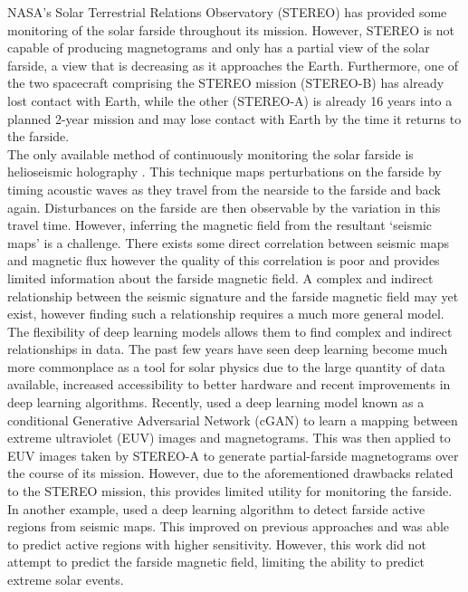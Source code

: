 \documentclass[11pt,a4paper,onecolumn]{report}
\begin{document}
NASA's Solar Terrestrial Relations Observatory (STEREO) has provided some
monitoring of the solar farside throughout its mission. However, STEREO is not
capable of producing magnetograms and only has a partial view of the solar
farside, a view that is decreasing as it approaches the Earth.
Furthermore, one of the two spacecraft comprising the STEREO mission (STEREO-B)
has already lost contact with Earth, while the other (STEREO-A) is already 16
years into a planned 2-year mission and may lose contact with Earth by the time
it returns to the farside. \\



The only available method of continuously monitoring the solar farside
is helioseismic holography \citep{lindsey_seismic_2000}. This technique maps
perturbations on the farside by timing acoustic waves as they travel from the
nearside to the farside and back again. Disturbances on the farside are then
observable by the variation in this travel time. However, inferring the magnetic
field from the resultant `seismic maps' is a challenge. There exists some direct
correlation between seismic maps and magnetic flux
\citep{Gonzalez_Hernandez_2007} however the quality of this correlation is poor
and provides limited information about the farside magnetic field. A complex and
indirect relationship between the seismic signature and the farside magnetic
field may yet exist, however finding such a relationship requires a much more
general model.\\


The flexibility of deep learning models allows them to find complex and indirect
relationships in data. The past few years have seen deep learning become much
more commonplace as a tool for solar physics due to the large quantity of data
available, increased accessibility to better hardware and recent improvements in
deep learning algorithms. Recently, \citet{Kim2019} used a deep learning model
known as a conditional Generative Adversarial Network (cGAN) to learn a mapping
between extreme ultraviolet (EUV) images and magnetograms. This was then applied
to EUV images taken by STEREO-A to generate partial-farside magnetograms over
the course of its mission. However, due to the aforementioned drawbacks related
to the STEREO mission, this provides limited utility for monitoring the farside.
In another example, \citet{felipe_improved_2019} used a deep learning algorithm
to detect farside active regions from seismic maps. This improved on previous
approaches and was able to predict active regions with higher sensitivity.
However, this work did not attempt to predict the farside magnetic field,
limiting the ability to predict extreme solar events. \\
\end{document}
